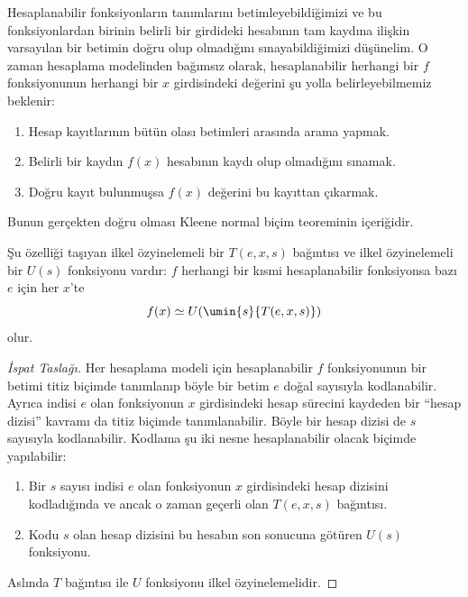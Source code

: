 


Hesaplanabilir fonksiyonların tanımlarını betimleyebildiğimizi ve bu
fonksiyonlardan birinin belirli bir girdideki hesabının tam kaydına ilişkin
varsayılan bir betimin doğru olup olmadığını sınayabildiğimizi düşünelim.
O zaman hesaplama modelinden bağımsız olarak, hesaplanabilir herhangi bir
$f$ fonksiyonunun herhangi bir $x$ girdisindeki değerini şu yolla
belirleyebilmemiz beklenir:
\begin{enumerate}
\item Hesap kayıtlarının bütün olası betimleri arasında arama yapmak.
\item Belirli bir kaydın $f(x)$ hesabının kaydı olup olmadığını sınamak.
\item Doğru kayıt bulunmuşsa $f(x)$ değerini bu kayıttan çıkarmak.
\end{enumerate}
Bunun gerçekten doğru olması Kleene normal biçim teoreminin içeriğidir.

\begin{thm}
Şu özelliği taşıyan ilkel özyinelemeli bir $T(e,x,s)$ bağıntısı ve ilkel
özyinelemeli bir $U(s)$ fonksiyonu vardır: $f$ herhangi bir kısmi
hesaplanabilir fonksiyonsa bazı $e$ için her $x$'te
\[
  f(x)\simeq U(\umin{s}{T(e,x,s)})
\]
olur.
\end{thm}

\begin{proof}[İspat Taslağı]
Her hesaplama modeli için hesaplanabilir $f$ fonksiyonunun bir betimi titiz
biçimde tanımlanıp böyle bir betim $e$ doğal sayısıyla kodlanabilir. Ayrıca
indisi $e$ olan fonksiyonun $x$ girdisindeki hesap sürecini kaydeden bir
``hesap dizisi'' kavramı da titiz biçimde tanımlanabilir. Böyle bir hesap
dizisi de $s$ sayısıyla kodlanabilir. Kodlama şu iki nesne hesaplanabilir
olacak biçimde yapılabilir:
\begin{enumerate}
\item Bir $s$ sayısı indisi $e$ olan fonksiyonun $x$ girdisindeki hesap
  dizisini kodladığında ve ancak o zaman geçerli olan $T(e,x,s)$ bağıntısı.
\item Kodu $s$ olan hesap dizisini bu hesabın son sonucuna götüren $U(s)$
  fonksiyonu.
\end{enumerate}
Aslında $T$ bağıntısı ile $U$ fonksiyonu ilkel özyinelemelidir.
\end{proof}

